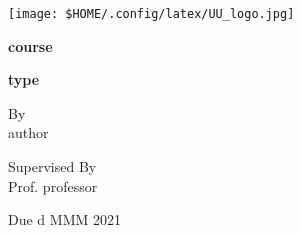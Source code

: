 \documentclass[12pt]{article}
\newcommand{\documentAuthor}{author}
\newcommand{\documentCourse}{course}
\newcommand{\documentType}{type}
\newcommand{\documentProfessor}{professor}
\newcommand{\documentDate}{d MMM 2021}
\begin{document}
\begin{titlepage}
    \begin{center}
        \texttt{[image: \$HOME/.config/latex/UU\_logo.jpg]} 
        \linebreak

        {\Large \textbf{\documentCourse}}

        {\Large \textbf{\documentType}}
        \linebreak

        {\footnotesize By}\\ 
        \documentAuthor


        \vspace{0.5cm}

        {\footnotesize Supervised By} \\
        Prof. \documentProfessor

        \vspace{0.5cm}

        Due \documentDate
    \end{center}
\end{titlepage}
\end{document}

